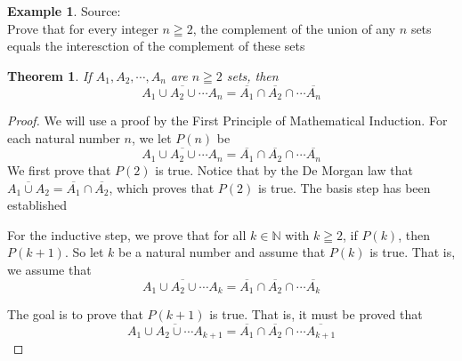 \documentclass{book}
\newtheorem{theorem}{Theorem}[section]
\theoremstyle{definition}
\newtheorem{example}{Example}[definition]
\theoremstyle{remark}
\newcommand{\bb}[1]{\mathbb{#1}}
\begin{document}
\begin{example}
Source: \cite[Chap.6, S.6.1, Result 6.6]{gray} \\ 


Prove that for every integer $n \geqq 2$, the complement of the union of any $n$ sets equals the interesction of the complement of these sets
    \begin{tcolorbox}
        \begin{theorem}
            If $A_1, A_2, \cdots, A_n$ are $n \geqq 2$ sets, then 
                \begin{equation*}
                    \overline{A_1 \cup A_2 \cup \cdots A_n} = \overline{A_1} \cap \overline{A_2} \cap \cdots \overline{A_n}
                \end{equation*}
        \end{theorem}
    \end{tcolorbox}

    \begin{proof}
        We will use a proof by the First Principle of Mathematical Induction. For each natural number $n$, we let $P(n)$ be
            \begin{equation*}
                \overline{A_1 \cup A_2 \cup \cdots A_n} = \overline{A_1} \cap \overline{A_2} \cap \cdots \overline{A_n}
            \end{equation*}
        We first prove that $P(2)$ is true. Notice that by the De Morgan law that $\overline{A_1 \cup A_2} = \overline{A_1} \cap \overline{A_2}$, which proves that $P(2)$ is true. The basis step has been established 
        
        For the inductive step, we prove that for all $k \in \bb{N}$ with $k \geqq 2$, if $P(k)$, then $P(k+1)$. So let $k$ be a natural number and assume that $P(k)$ is true. That is, we assume that 
            \begin{equation*}
                \overline{A_1 \cup A_2 \cup \cdots A_k} = \overline{A_1} \cap \overline{A_2} \cap \cdots \overline{A_k}
            \end{equation*}
        
        The goal is to prove that $P(k+1)$ is true. That is, it must be proved that  
            \begin{equation*}
                \overline{A_1 \cup A_2 \cup \cdots A_{k+1}} = \overline{A_1} \cap \overline{A_2} \cap \cdots \overline{A_{k+1}}
            \end{equation*}
        

\end{proof}
\end{example}
\end{document}
